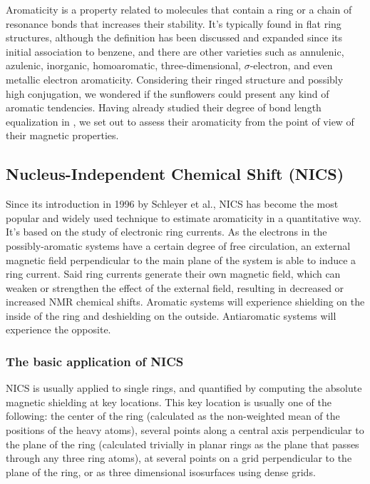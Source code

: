 Aromaticity is a property related to molecules that contain a ring or a chain of resonance bonds that increases their stability.
It’s typically found in flat ring structures, although the definition has been discussed and expanded since its initial association to benzene, and there are other varieties such as annulenic, azulenic, inorganic, homoaromatic, three-dimensional, $\sigma$-electron, and even metallic electron aromaticity.
Considering their ringed structure and possibly high conjugation, we wondered if the sunflowers could present any kind of aromatic tendencies.
Having already studied their degree of bond length equalization in , we set out to assess their aromaticity from the point of view of their magnetic properties.

\subsection{Nucleus-Independent Chemical Shift (NICS)}
Since its introduction in 1996 by Schleyer et al., NICS has become the most popular and widely used technique to estimate aromaticity in a quantitative way.
It's based on the study of electronic ring currents.
As the electrons in the possibly-aromatic systems have a certain degree of free circulation, an external magnetic field perpendicular to the main plane of the system is able to induce a ring current.
Said ring currents generate their own magnetic field, which can weaken or strengthen the effect of the external field, resulting in decreased or increased NMR chemical shifts.
Aromatic systems will experience shielding on the inside of the ring and deshielding on the outside.
Antiaromatic systems will experience the opposite.

\subsubsection{The basic application of NICS}
NICS is usually applied to single rings, and quantified by computing the absolute magnetic shielding at key locations.
This key location is usually one of the following: the center of the ring (calculated as the non-weighted mean of the positions of the heavy atoms), several points along a central axis perpendicular to the plane of the ring (calculated trivially in planar rings as the plane that passes through any three ring atoms), at several points on a grid perpendicular to the plane of the ring, or as three dimensional isosurfaces using dense grids.

